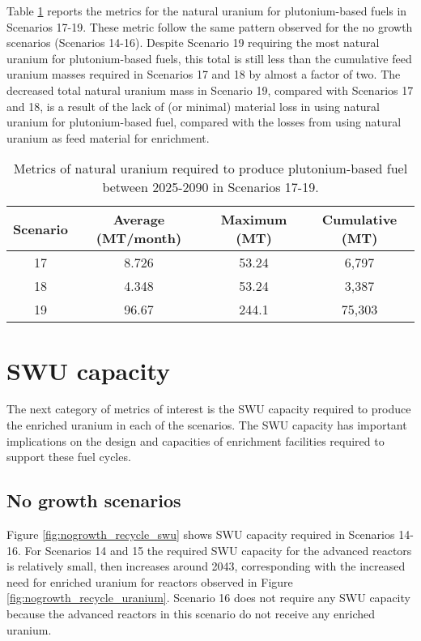 Table \ref{tab:s17-19_natU} reports the metrics for the 
natural uranium for plutonium-based fuels in Scenarios 17-19. 
These metric follow the same pattern observed for the 
no growth scenarios (Scenarios 14-16). Despite Scenario 19 
requiring the most natural uranium for plutonium-based 
fuels, this total is still less than the cumulative feed uranium 
masses required in Scenarios 17 and 18 by almost a factor 
of two. The decreased total 
natural uranium mass in Scenario 19, compared with Scenarios 
17 and 18, is a result of the lack of (or minimal) material loss in 
using natural uranium for plutonium-based fuel, compared with 
the losses from using natural uranium as feed material for 
enrichment. 

\begin{table}[h!]
    \centering 
    \caption{Metrics of natural uranium required to produce 
    plutonium-based fuel between 2025-2090 in Scenarios 
    17-19.}
    \label{tab:s17-19_natU}
    \begin{tabular}{c c c c}
        \hline 
        Scenario & Average (MT/month) & Maximum (MT) & Cumulative (MT) \\
        \hline
        17 & 8.726 & 53.24 & 6,797\\
        18 & 4.348 & 53.24 & 3,387\\
        19 & 96.67 & 244.1 & 75,303\\
        \hline
    \end{tabular}
\end{table}


\section{SWU capacity}
The next category of metrics of interest is the \gls{SWU} capacity required 
to produce the enriched uranium in each of the scenarios. The \gls{SWU} 
capacity has important implications on the design and capacities of 
enrichment facilities required to support these fuel cycles. 

\subsection{No growth scenarios}
Figure \ref{fig:nogrowth_recycle_swu} shows \gls{SWU} capacity required 
in Scenarios 14-16. For Scenarios 14 and 15 the required \gls{SWU} 
capacity for the advanced reactors is relatively small, then increases 
around 2043, corresponding with the increased need for enriched uranium 
for reactors observed in Figure \ref{fig:nogrowth_recycle_uranium}. Scenario 
16 does not require any \gls{SWU} capacity because the advanced reactors 
in this scenario do not receive any enriched uranium. 

